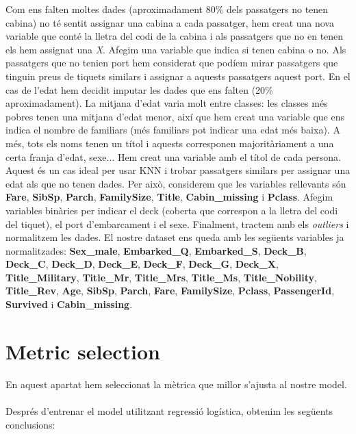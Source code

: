 \documentclass[9pt,a4paper,twoside]{tau-class/tau}
\begin{document}
Com ens falten moltes dades (aproximadament 80\% dels passatgers no tenen cabina) no té sentit assignar una cabina a cada passatger, hem creat una nova variable que conté la lletra del codi de la cabina i als passatgers que no en tenen els hem assignat una \textit{X}. Afegim una variable que indica si tenen cabina o no.
Als passatgers que no tenien port hem considerat que podíem mirar passatgers que tinguin preus de tiquets similars i assignar a aquests passatgers aquest port.
En el cas de l'edat hem decidit imputar les dades que ens falten (20\% aproximadament). La mitjana d'edat varia molt entre classes: les classes més pobres tenen una mitjana d'edat menor, així que hem creat una variable que ens indica el nombre de familiars (més familiars pot indicar una edat més baixa). A més, tots els noms tenen un títol i aquests corresponen majoritàriament a una certa franja d'edat, sexe...
Hem creat una variable amb el títol de cada persona. Aquest és un cas ideal per usar KNN i trobar passatgers similars per assignar una edat als que no tenen dades. Per això, considerem que les variables rellevants són \textbf{Fare}, \textbf{SibSp}, \textbf{Parch}, \textbf{FamilySize}, \textbf{Title}, \textbf{Cabin\_missing} i  \textbf{Pclass}.
Afegim variables binàries per indicar el deck (coberta que correspon a la lletra del codi del tiquet), el port d'embarcament i el sexe.
Finalment, tractem amb els \textit{outliers} i normalitzem les dades.
El nostre dataset ens queda amb les següents variables ja normalitzades: \textbf{Sex\_male}, \textbf{Embarked\_Q}, \textbf{Embarked\_S}, \textbf{Deck\_B}, \textbf{Deck\_C}, \textbf{Deck\_D},
\textbf{Deck\_E}, \textbf{Deck\_F}, \textbf{Deck\_G}, \textbf{Deck\_X}, \textbf{Title\_Military}, \textbf{Title\_Mr},
\textbf{Title\_Mrs}, \textbf{Title\_Ms}, \textbf{Title\_Nobility}, \textbf{Title\_Rev}, \textbf{Age}, \textbf{SibSp},
\textbf{Parch}, \textbf{Fare}, \textbf{FamilySize}, \textbf{Pclass}, \textbf{PassengerId}, \textbf{Survived} i
\textbf{Cabin\_missing}.

\section{Metric selection}

En aquest apartat hem seleccionat la mètrica que millor s'ajusta al nostre model.
\\\\
Després d'entrenar el model utilitzant regressió logística, obtenim les següents conclusions:
\end{document}
